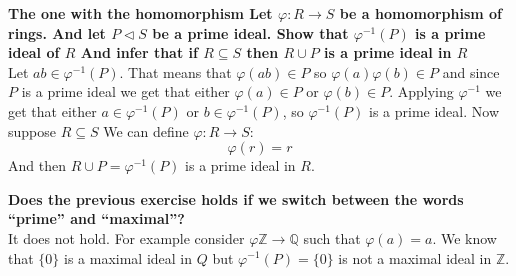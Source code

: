 \documentclass{article}
\theoremstyle{plain}
\DeclareMathOperator{\idealin}{\triangleleft}
\newcommand{\Z}{\mathbb{Z}}
\newcommand{\Q}{\mathbb{Q}}
\begin{document}
    \newpage

    \textbf{The one with the homomorphism
    Let $\varphi : R \to S$ be a homomorphism of rings. And let
    $P \idealin S$ be a prime ideal. Show that $\varphi^{-1}(P)$ is a prime 
    ideal of $R$ And infer that if $R\subseteq S$ then $R\cup P$ is a prime 
	ideal in $R$} \\
    Let $ab\in \varphi^{-1}(P)$. That means that $\varphi(ab)\in P$
    so $\varphi(a)\varphi(b)\in P$ and since $P$ is a prime ideal we get that 
    either $\varphi(a)\in P$ or $\varphi(b)\in P$.
    Applying $\varphi^{-1}$ we get that 
    either $a \in \varphi^{-1}(P)$ or $b\in \varphi^{-1}(P)$, so
    $\varphi^{-1}(P)$ is a prime ideal. Now suppose $R\subseteq S$
    We can define $\varphi: R\to S$:
    \[
        \varphi(r)=r
    \]
    And then $R\cup P = \varphi^{-1}(P)$ is a prime ideal in $R$.
    
    \newpage

    \textbf{Does the previous exercise holds if we switch between
    the words ``prime'' and ``maximal''?} \\
	It does not hold. For example consider $\varphi \Z \to \Q$
    such that $\varphi(a) = a$. We know that $\{0\}$ is a maximal
    ideal in $Q$ but $\varphi^{-1}(P) = \{0\}$ is not a maximal
    ideal in $\Z$.
    
    \newpage
    
\end{document}
